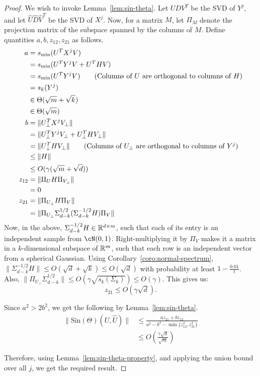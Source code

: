 \begin{proof}
    We wish to invoke Lemma~\ref{lem:sin-theta}. Let $UDV^T$
    be the SVD of $Y^j$, and let $\hat{U}\hat{D}\hat{V}^T$ be
    the SVD of $X^j$. Now, for a matrix $M$, let $\Pi_M$ denote
    the projection matrix of the subspace spanned by the columns
    of $M$. Define quantities $a,b,z_{12},z_{21}$ as follows.
    \begin{align*}
        a &= s_{\min}(U^TX^jV)\\
            &= s_{\min}(U^TY^jV + U^THV)\\
            &= s_{\min}(U^TY^jV) \tag{Columns of $U$ are orthogonal to columns of $H$}\\
            &= s_k(Y^j)\\
            &\in \Theta(\sqrt{m}+\sqrt{k})\\
            &\in \Theta(\sqrt{m})\\
        b &= \|U_{\bot}^TX^jV_{\bot}\|\\
            &= \|U_{\bot}^TY^jV_{\bot} + U_{\bot}^THV_{\bot}\|\\
            &= \|U_{\bot}^THV_{\bot}\|
                \tag{Columns of $U_{\bot}$ are orthogonal to columns of $Y^j$}\\
            &\leq \|H\|\\
            &\leq O(\gamma(\sqrt{m}+\sqrt{d}))\\
        z_{12} &= \|\Pi_U H \Pi_{V_{\bot}}\|\\
            &= 0\\
        z_{21} &= \|\Pi_{U_{\bot}}H\Pi_V\|\\
            &= \|\Pi_{U_{\bot}}\Sigma_{d-k}^{1/2}(\Sigma_{d-k}^{-1/2}H)\Pi_V\|
    \end{align*}
    Now, in the above, $\Sigma_{d-k}^{-1/2}H \in \mathbb{R}^{d\times m}$,
    such that each of its entry is an independent sample from $\cN(0,1)$.
    Right-multiplying it by $\Pi_V$ makes it a matrix
    in a $k$-dimensional subspace of $\mathbb{R}^m$, such that
    each row is an independent vector from a spherical
    Gaussian. Using Corollary~\ref{coro:normal-spectrum},
    $\|\Sigma_{d-k}^{-1/2}H\| \leq O(\sqrt{d}+\sqrt{k}) \leq O(\sqrt{d})$
    with probability at least $1-\tfrac{0.01}{t}$.
    Also, $\|\Pi_{U_{\bot}}\Sigma_{d-k}^{1/2}\| \leq O(\gamma\sqrt{s_k(\Sigma_k)}) \leq O(\gamma)$.
    This gives us:
    $$z_{21} \leq O(\gamma\sqrt{d}).$$

    Since $a^2 > 2b^2$, we get the following by
    Lemma~\ref{lem:sin-theta}.
    \begin{align*}
        \|\text{Sin}(\Theta)(U,\hat{U})\| &\leq \frac{az_{21} + bz_{12}}
                {a^2-b^2-\min\{z_{12}^2,z_{21}^2\}}\\
            &\leq O\left(\frac{\gamma\sqrt{d}}{\sqrt{m}}\right)
    \end{align*}

    Therefore, using Lemma~\ref{lem:sin-theta-property},
    and applying the union bound over all $j$, we get the
    required result.
\end{proof}

